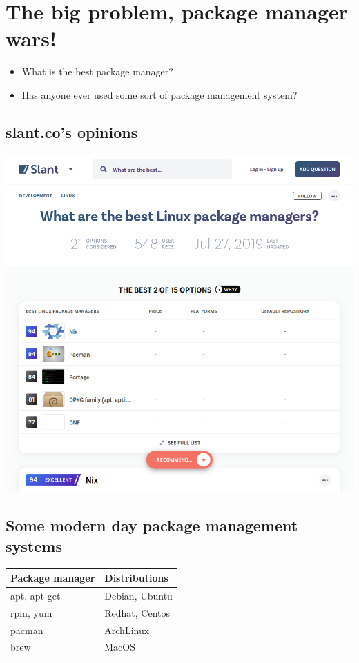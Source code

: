 \documentclass[11pt]{article}
\begin{document}
\section{The big problem, package manager wars!}
\label{sec:org0bd2b5c}
\begin{itemize}
\item What is the best package manager?
\item Has anyone ever used some sort of package management system?
\end{itemize}
\subsection{slant.co's opinions}
\label{sec:org415e91b}
\begin{center}
\includegraphics[width=.9\linewidth]{./images/screenshot-09.png}
\end{center}
\subsection{Some modern day package management systems}
\label{sec:orgd564c57}
\begin{center}
\begin{tabular}{ll}
Package manager & Distributions\\
\hline
apt, apt-get & Debian, Ubuntu\\
rpm, yum & Redhat, Centos\\
pacman & ArchLinux\\
brew & MacOS\\
\end{tabular}
\end{center}
\end{document}
